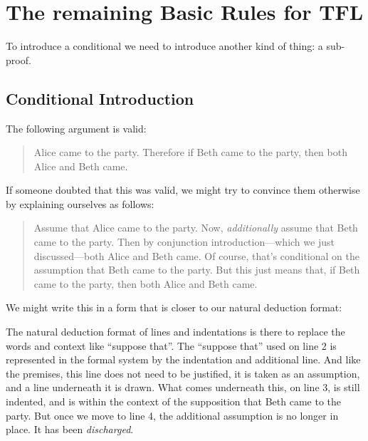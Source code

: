 \chapter{The remaining Basic Rules for TFL}


To introduce a conditional we need to introduce another kind of thing: a sub-proof.

\section{Conditional Introduction}
The following argument is valid:
	\begin{quote}
		Alice came to the party. Therefore if Beth came to the party, then both Alice and Beth came.
	\end{quote}
If someone doubted that this was valid, we might try to convince them otherwise by explaining ourselves as follows:
	\begin{quote}
		Assume that Alice came to the party. Now, \emph{additionally} assume that Beth came to the party. Then by conjunction introduction---which we just discussed---both Alice and Beth came. Of course, that's conditional on the assumption that Beth came to the party. But this just means that, if Beth came to the party, then both Alice and Beth came.
	\end{quote}

We might write this in a form that is closer to our natural deduction format:
\begin{fitchproof}
	\open
		\close
\end{fitchproof}\medskip
The natural deduction format of lines and indentations is there to replace the words and context like ``suppose that''. The ``suppose that'' used on line 2 is represented in the formal system by the indentation and additional line. And like the premises, this line does not need to be justified, it is taken as an assumption, and a line underneath it is drawn. What comes underneath this, on line 3, is still indented, and is within the context of the supposition that Beth came to the party. But once we move to line 4, the additional assumption is no longer in place. It has been \emph{discharged}.

